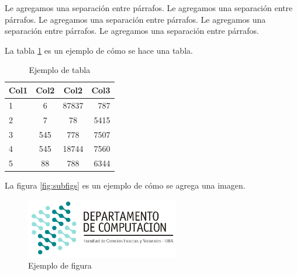 \documentclass[10pt,a4paper]{article}
\begin{document}
\vspace{0.3cm}

Le agregamos una separación entre párrafos. Le agregamos una separación entre párrafos. Le agregamos una separación entre párrafos. Le agregamos una separación entre párrafos. Le agregamos una separación entre párrafos.

\vspace{0.3cm}

La tabla \ref{tab:ejemplo} es un ejemplo de cómo se hace una tabla.

\begin{table}[h!]
	\centering
	\begin{tabular}{||l c c r||} 
		\hline
		Col1 & Col2 & Col2 & Col3 \\ [0.5ex] 
		\hline\hline
		1 & 6 & 87837 & 787 \\ 
		2 & 7 & 78 & 5415 \\
		3 & 545 & 778 & 7507 \\
		4 & 545 & 18744 & 7560 \\
		5 & 88 & 788 & 6344 \\
		\hline
	\end{tabular}
	\caption{Ejemplo de tabla}
	\label{tab:ejemplo}
\end{table}


La figura \ref{fig:subfigs} es un ejemplo de cómo se agrega una imagen.

\begin{figure}[ht]
	\centering
	\includegraphics[width=0.6\textwidth]{logo_dc.jpg}
	\caption{Ejemplo de figura}
	\label{fig:ejemplo}
\end{figure}
\end{document}
